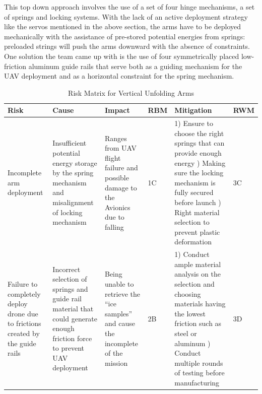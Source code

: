 			This top down approach involves the use of a set of four hinge mechanisms, a set of springs and locking systems. With the lack of an active deployment strategy like the servos mentioned in the above section, the arms have to be deployed mechanically with the assistance of pre-stored potential energies from springs: preloaded strings will push the arms downward with the absence of constraints. One solution the team came up with is the use of four symmetrically placed low-friction aluminum guide rails that serve both as a guiding mechanism for the UAV deployment and as a horizontal constraint for the spring mechanism.
			            \begin{table}[]
                \label{vertical unfolding arms}
                {\footnotesize
                \caption{Risk Matrix for Vertical Unfolding Arms}
                \centering
                \begin{tabularx}{\linewidth}{XXXlXl}
                \toprule
                \textbf{Risk}                                            & \textbf{Cause}                                                                                                                 & \textbf{Impact}                                                                                                                           & \textbf{RBM}  & \textbf{Mitigation}                                                                                                                                                                                     & \textbf{RWM} \\
                \midrule
                Incomplete arm deployment & Insufficient potential energy storage by the spring mechanism and misalignment of locking mechanism & Ranges from UAV flight failure and possible damage to the Avionics due to falling & \cellcolor{red!25} 1C & 1) Ensure to choose the right springs that can provide enough energy \newline 2) Making sure the locking mechanism is fully secured before launch \newline 3) Right material selection to prevent plastic deformation & \cellcolor{orange!25} 3C \\
                Failure to completely deploy drone due to frictions created by the guide rails & Incorrect selection of springs and guide rail material that could generate enough friction force to prevent UAV deployment & Being unable to retrieve the “ice samples” and cause the incomplete of the mission & \cellcolor{red!25} 2B & 1) Conduct ample material analysis on the selection and choosing materials having the lowest friction such as steel or aluminum \newline 2) Conduct multiple rounds of testing before manufacturing & \cellcolor{green!25} 3D \\

\end{tabularx}}
\end{table}
